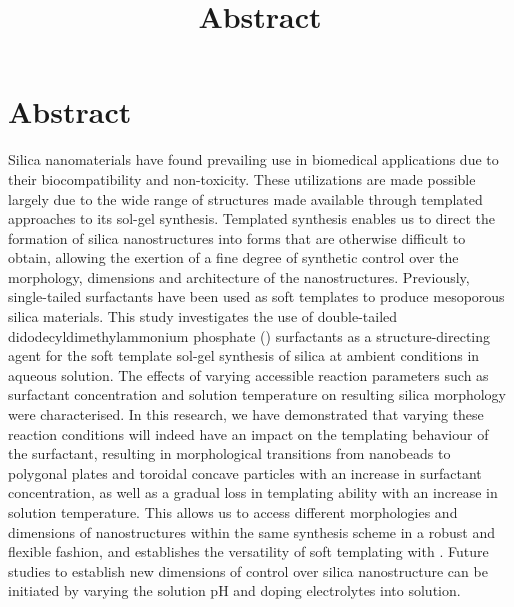 \documentclass[a4paper,12pt]{article}
\date{}
\title{Abstract} %
\begin{document}
	\section*{Abstract}
	
	\vspace{1.5\baselineskip} %
	
	
	Silica nanomaterials have found prevailing use in biomedical applications due to their biocompatibility and non-toxicity. These utilizations are made possible largely due to the wide range of structures made available through templated approaches to its sol-gel synthesis. Templated synthesis enables us to direct the formation of silica nanostructures into forms that are otherwise difficult to obtain, allowing the exertion of a fine degree of synthetic control over the morphology, dimensions and architecture of the nanostructures. Previously, single-tailed surfactants have been used as soft templates to produce mesoporous silica materials. This study investigates the use of double-tailed didodecyldimethylammonium phosphate () surfactants as a structure-directing agent for the soft template sol-gel synthesis of silica at ambient conditions in aqueous solution. The effects of varying accessible reaction parameters such as surfactant concentration and solution temperature on resulting silica morphology were characterised. In this research, we have demonstrated that varying these reaction conditions will indeed have an impact on the templating behaviour of the surfactant, resulting in morphological transitions from nanobeads to polygonal plates and toroidal concave particles with an increase in surfactant concentration, as well as a gradual loss in templating ability with an increase in solution temperature. This allows us to access different morphologies and dimensions of nanostructures within the same synthesis scheme in a robust and flexible fashion, and establishes the versatility of soft templating with . Future studies to establish new dimensions of control over silica nanostructure can be initiated by varying the solution pH and doping electrolytes into solution.
	 
	 
	
\end{document}
